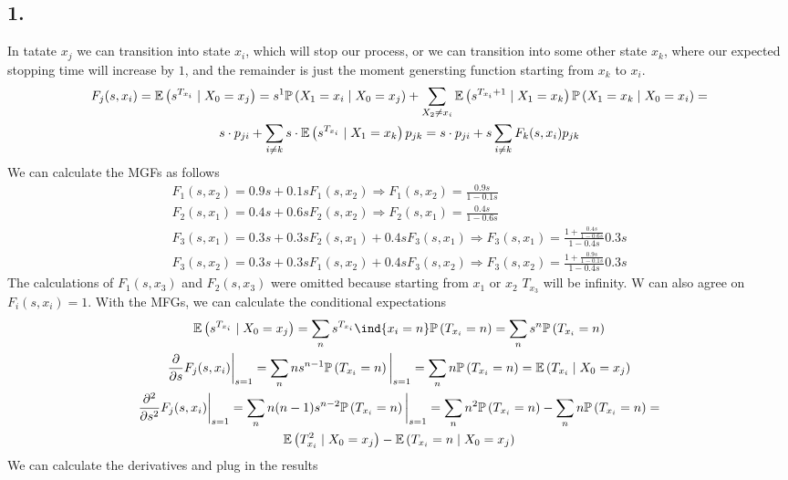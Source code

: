 \subsection*{1.}
In tatate $x_j$ we can transition into state $x_i$, which will stop our process, or we can transition into some other state $x_k$, where our expected stopping time will increase by $1$, and the remainder is just the moment genersting function starting from $x_k$ to $x_i$.
\begin{gather*}
    F_j (s,x_i)=\mathbb{E}\left( s^{T_{x_i}} \mid X_0=x_j \right) = s^1 \mathbb{P}\left( X_1 = x_i \mid X_0 = x_j \right) + \sum_{X_2 \neq x_i} \mathbb{E}\left( s^{T_{x_i}+1} \mid X_1=x_k \right) \mathbb{P}\left( X_1=x_k \mid X_0=x_i \right) = \\
    s\cdot  p_{ji} + \sum_{i \neq k} s \cdot \mathbb{E}\left( s^{T_{x_i}} \mid X_1=x_k \right) p_{jk} = s \cdot p_{ji} +s  \sum_{i \neq k} F_k(s,x_i) p_{jk}
\end{gather*}
We can calculate the MGFs as follows
\begin{gather*}
    F_1(s,x_2) = 0.9s + 0.1 s F_1(s,x_2) \Longrightarrow  F_1(s,x_2) = \frac{0.9s}{1-0.1s} \\
    F_2(s,x_1) = 0.4s + 0.6 s F_2(s,x_2) \Longrightarrow F_2(s,x_1) = \frac{0.4s}{1-0.6s} \\
    F_3(s,x_1) = 0.3 s + 0.3 sF_2(s,x_1) + 0.4 sF_3(s,x_1) \Longrightarrow F_3(s,x_1)= \frac{1+\frac{0.4s}{1-0.6s}}{1-0.4s}0.3s\\
    F_3(s,x_2) = 0.3 s + 0.3s F_1(s,x_2) + 0.4 sF_3(s,x_2) \Longrightarrow F_3(s,x_2)= \frac{1+\frac{0.9s}{1-0.1s}}{1-0.4s}0.3s 
\end{gather*}
The calculations of $F_1(s,x_3)$ and $F_2(s,x_3)$ were omitted because starting from $x_1$ or $x_2$ $T_{x_3}$ will be infinity. W can also agree on $F_i(s,x_i)=1$.
With the MFGs, we can calculate the conditional expectations 
\begin{gather*}
    \cE{s^{T_{x_i}}}{X_0=x_j}=\sum_n s^{T_{x_i}}\ind{x_i=n}\pr{T_{x_i}=n} = \sum_n s^n \pr{T_{x_i}=n} \\
    \frac{\partial}{\partial s}F_j(s,x_i)\dummy{s=1} = \sum_n n s^{n-1} \pr{T_{x_i}=n}\dummy{s=1} = \sum_n n \pr{T_{x_i}=n}=\cE{T_{x_i}}{X_0=x_j} \\
    \frac{\partial^2}{\partial s^2}F_j(s,x_i)\dummy{s=1} = \sum_n n(n-1) s^{n-2} \pr{T_{x_i}=n}\dummy{s=1} = \sum_n n^2 \pr{T_{x_i}=n} - \sum_n n \pr{T_{x_i}=n} = \\ \cE{T^2_{x_i}}{X_0=x_j}- \cE{T_{x_i}=n}{X_0=x_j}
\end{gather*}
We can calculate the derivatives and plug in the results
